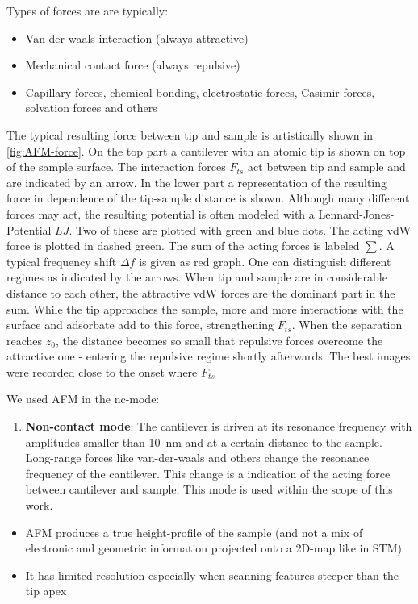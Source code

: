 Types of forces are are typically:
\begin{itemize}
 \item Van-der-waals interaction (always attractive)
 \item Mechanical contact force (always repulsive)
 \item Capillary forces, chemical bonding, electrostatic forces, Casimir forces, solvation forces and others
\end{itemize}

The typical resulting force between tip and sample is artistically shown in \autoref{fig:AFM-force}. On the top part a cantilever with an atomic tip is shown on top of the sample surface. The interaction forces $F_{ts}$ act between tip and sample and are indicated by an arrow. In the lower part a representation of the resulting force in dependence of the tip-sample distance is shown. Although many different forces may act, the resulting potential is often modeled with a Lennard-Jones-Potential $LJ$\cite{jones_determination_1924}. Two of these are plotted with green and blue dots. The acting vdW force is plotted in dashed green. The sum of the acting forces is labeled $\sum$. A typical frequency shift $\Delta f$ is given as red graph. One can distinguish different regimes as indicated by the arrows. When tip and sample are in considerable distance to each other, the attractive vdW forces are the dominant part in the sum. While the tip approaches the sample, more and more interactions with the surface and adsorbate add to this force, strengthening $F_{ts}$. When the separation reaches $z_0$, the distance becomes so small that repulsive forces overcome the attractive one - entering the repulsive regime shortly afterwards. The best images were recorded close to the onset where $F_{ts}$ 

We used AFM in the nc-mode:
\begin{enumerate}
  \item \textbf{Non-contact mode}: The cantilever is driven at its resonance frequency with amplitudes smaller than \SI{10}{\nm} and at a certain distance to the sample. Long-range forces like van-der-waals and others change the resonance frequency of the cantilever. This change is a indication of the acting force between cantilever and sample. This mode is used within the scope of this work.
\end{enumerate}

\begin{itemize}
 \item AFM produces a true height-profile of the sample (and not a mix of electronic and geometric information projected onto a 2D-map like in STM)
 \item It has limited resolution especially when scanning features steeper than the tip apex
\end{itemize}

